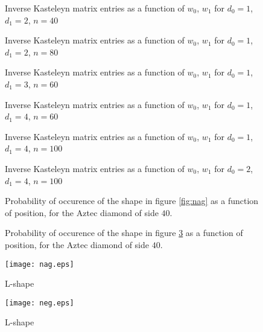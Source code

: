 \documentclass[10pt,reqno]{amsart}
\theoremstyle{plain}
\theoremstyle{definition}
\theoremstyle{remark}
\begin{document}
\begin{figure}
\centering 
{}
\caption{Inverse Kasteleyn matrix entries as a function of $w_0$, $w_1$
for $d_0=1$, $d_1=2$, $n=40$}\label{fig:ha} 
\end{figure}
\begin{figure}
\centering
{}
\caption{Inverse Kasteleyn matrix entries as a function of $w_0$, $w_1$
for $d_0=1$, $d_1=2$, $n=80$} 
\end{figure}
\begin{figure}
\centering
{}
\caption{Inverse Kasteleyn matrix entries as a function of $w_0$, $w_1$
for $d_0=1$, $d_1=3$, $n=60$}
\end{figure}
\begin{figure}
\centering
{}
\caption{Inverse Kasteleyn matrix entries as a function of $w_0$, $w_1$
for $d_0=1$, $d_1=4$, $n=60$}
\end{figure}
\begin{figure}
\centering
{}
\caption{Inverse Kasteleyn matrix entries as a function of $w_0$, $w_1$
for $d_0=1$, $d_1=4$, $n=100$}
\end{figure}
\begin{figure}
\centering 
{}
\caption{Inverse Kasteleyn matrix entries as a function of $w_0$, $w_1$
for $d_0=2$, $d_1=4$, $n=100$}\label{fig:he}
\end{figure}
\begin{figure}
\centering
{}
\caption{Probability of occurence of the shape in figure \ref{fig:nag}
as a function of position, for the Aztec diamond of side $40$.}
\end{figure}
\begin{figure}
\centering
{}
\caption{Probability of occurence of the shape in figure \ref{fig:neg}
as a function of position, for the Aztec diamond of side $40$.}
\end{figure}
\begin{figure}
        \begin{minipage}[b]{0.5\linewidth}
                \centering \texttt{[image: nag.eps]}
                \caption{L-shape}\label{fig:nag}
        \end{minipage}%
        \begin{minipage}[b]{0.5\linewidth}
                \texttt{[image: neg.eps]}
                \caption{L-shape} \label{fig:neg}   
        \end{minipage}%
\end{figure}
\end{document}
